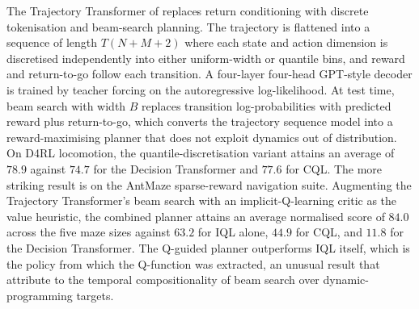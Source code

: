 The Trajectory Transformer of \citet{Janner2021TT} replaces return conditioning
with discrete tokenisation and beam-search planning. The trajectory is flattened
into a sequence of length $T(N + M + 2)$ where each state and action dimension is
discretised independently into either uniform-width or quantile bins, and reward
and return-to-go follow each transition. A four-layer four-head GPT-style decoder
is trained by teacher forcing on the autoregressive log-likelihood. At test time,
beam search with width $B$ replaces transition log-probabilities with predicted
reward plus return-to-go, which converts the trajectory sequence model into a
reward-maximising planner that does not exploit dynamics out of distribution.
On D4RL locomotion, the quantile-discretisation variant attains an average of
$78.9$ against $74.7$ for the Decision Transformer and $77.6$ for CQL. The more
striking result is on the AntMaze sparse-reward navigation suite. Augmenting the
Trajectory Transformer's beam search with an implicit-Q-learning critic as the
value heuristic, the combined planner attains an average normalised score of
$84.0$ across the five maze sizes against $63.2$ for IQL alone, $44.9$ for CQL,
and $11.8$ for the Decision Transformer. The Q-guided planner outperforms IQL
itself, which is the policy from which the Q-function was extracted, an unusual
result that \citet{Janner2021TT} attribute to the temporal compositionality of
beam search over dynamic-programming targets.

